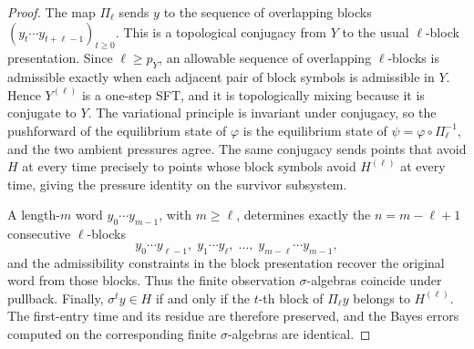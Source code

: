 \begin{proof}
The map \(\Pi_\ell\) sends \(y\) to the sequence of overlapping blocks
\((y_t\cdots y_{t+\ell-1})_{t\geq0}\).  This is a topological conjugacy
from \(Y\) to the usual \(\ell\)-block presentation.  Since
\(\ell\geq p_Y\), an allowable sequence of overlapping \(\ell\)-blocks
is admissible exactly when each adjacent pair of block symbols is
admissible in \(Y\).  Hence \(Y^{(\ell)}\) is a one-step SFT, and it is
topologically mixing because it is conjugate to \(Y\).
The variational principle is invariant under conjugacy, so the
pushforward of the equilibrium state of \(\varphi\) is the equilibrium
state of \(\psi=\varphi\circ\Pi_\ell^{-1}\), and the two ambient
pressures agree.
The same conjugacy sends points that avoid \(H\) at every time precisely
to points whose block symbols avoid \(H^{(\ell)}\) at every time, giving
the pressure identity on the survivor subsystem.

A length-\(m\) word \(y_0\cdots y_{m-1}\), with \(m\geq\ell\), determines
exactly the \(n=m-\ell+1\) consecutive \(\ell\)-blocks
\[
  y_0\cdots y_{\ell-1},\;
  y_1\cdots y_\ell,\;\ldots,\;
  y_{m-\ell}\cdots y_{m-1},
\]
and the admissibility constraints in the block presentation recover the
original word from those blocks.  Thus the finite observation
\(\sigma\)-algebras coincide under pullback.  Finally,
\(\sigma^t y\in H\) if and only if the \(t\)-th block of
\(\Pi_\ell y\) belongs to \(H^{(\ell)}\).  The first-entry time and its
residue are therefore preserved, and the Bayes errors computed on the
corresponding finite \(\sigma\)-algebras are identical.
\end{proof}

